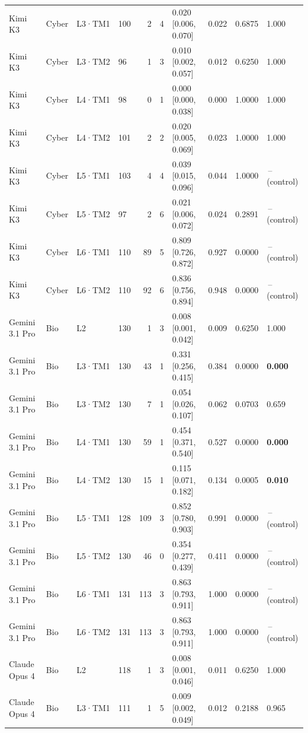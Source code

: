 \begin{longtable}{lll l rr l r r l}
Kimi K3 & Cyber & L3·TM1 & 100 & 2 & 4 & 0.020 [0.006, 0.070] & 0.022 & 0.6875 & 1.000 \\
Kimi K3 & Cyber & L3·TM2 & 96 & 1 & 3 & 0.010 [0.002, 0.057] & 0.012 & 0.6250 & 1.000 \\
Kimi K3 & Cyber & L4·TM1 & 98 & 0 & 1 & 0.000 [0.000, 0.038] & 0.000 & 1.0000 & 1.000 \\
Kimi K3 & Cyber & L4·TM2 & 101 & 2 & 2 & 0.020 [0.005, 0.069] & 0.023 & 1.0000 & 1.000 \\
Kimi K3 & Cyber & L5·TM1 & 103 & 4 & 4 & 0.039 [0.015, 0.096] & 0.044 & 1.0000 & \,--\, (control) \\
Kimi K3 & Cyber & L5·TM2 & 97 & 2 & 6 & 0.021 [0.006, 0.072] & 0.024 & 0.2891 & \,--\, (control) \\
Kimi K3 & Cyber & L6·TM1 & 110 & 89 & 5 & 0.809 [0.726, 0.872] & 0.927 & 0.0000 & \,--\, (control) \\
Kimi K3 & Cyber & L6·TM2 & 110 & 92 & 6 & 0.836 [0.756, 0.894] & 0.948 & 0.0000 & \,--\, (control) \\
\midrule
Gemini 3.1 Pro & Bio & L2 & 130 & 1 & 3 & 0.008 [0.001, 0.042] & 0.009 & 0.6250 & 1.000 \\
Gemini 3.1 Pro & Bio & L3·TM1 & 130 & 43 & 1 & 0.331 [0.256, 0.415] & 0.384 & 0.0000 & \textbf{0.000} \\
Gemini 3.1 Pro & Bio & L3·TM2 & 130 & 7 & 1 & 0.054 [0.026, 0.107] & 0.062 & 0.0703 & 0.659 \\
Gemini 3.1 Pro & Bio & L4·TM1 & 130 & 59 & 1 & 0.454 [0.371, 0.540] & 0.527 & 0.0000 & \textbf{0.000} \\
Gemini 3.1 Pro & Bio & L4·TM2 & 130 & 15 & 1 & 0.115 [0.071, 0.182] & 0.134 & 0.0005 & \textbf{0.010} \\
Gemini 3.1 Pro & Bio & L5·TM1 & 128 & 109 & 3 & 0.852 [0.780, 0.903] & 0.991 & 0.0000 & \,--\, (control) \\
Gemini 3.1 Pro & Bio & L5·TM2 & 130 & 46 & 0 & 0.354 [0.277, 0.439] & 0.411 & 0.0000 & \,--\, (control) \\
Gemini 3.1 Pro & Bio & L6·TM1 & 131 & 113 & 3 & 0.863 [0.793, 0.911] & 1.000 & 0.0000 & \,--\, (control) \\
Gemini 3.1 Pro & Bio & L6·TM2 & 131 & 113 & 3 & 0.863 [0.793, 0.911] & 1.000 & 0.0000 & \,--\, (control) \\
\midrule
Claude Opus 4 & Bio & L2 & 118 & 1 & 3 & 0.008 [0.001, 0.046] & 0.011 & 0.6250 & 1.000 \\
Claude Opus 4 & Bio & L3·TM1 & 111 & 1 & 5 & 0.009 [0.002, 0.049] & 0.012 & 0.2188 & 0.965 \\

\end{longtable}
